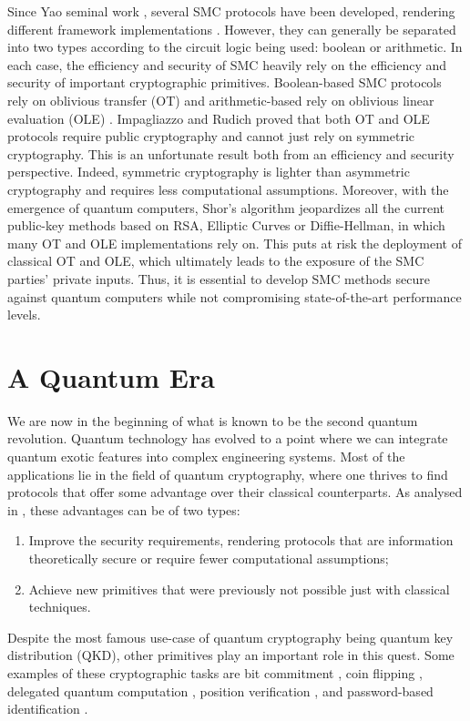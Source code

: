 Since Yao seminal work \cite{Y86}, several SMC protocols have been developed, rendering different framework implementations \cite{Goldreich87, Bendlin11, D12}. However, they can generally be separated into two types according to the circuit logic being used: boolean or arithmetic. In each case, the efficiency and security of SMC heavily rely on the efficiency and security of important cryptographic primitives. Boolean-based SMC protocols rely on oblivious transfer (OT) \cite{K88} and arithmetic-based rely on oblivious linear evaluation (OLE) \cite{DPSZ12}. Impagliazzo and Rudich \cite{IR99} proved that both OT and OLE protocols require public cryptography and cannot just rely on symmetric cryptography. This is an unfortunate result both from an efficiency and security perspective. Indeed, symmetric cryptography is lighter than asymmetric cryptography and requires less computational assumptions. Moreover, with the emergence of quantum computers, Shor’s algorithm \cite{Sho95} jeopardizes all the current public-key methods based on RSA, Elliptic Curves or Diffie-Hellman, in which many OT and OLE implementations rely on. This puts at risk the deployment of classical OT and OLE, which ultimately leads to the exposure of the SMC parties’ private inputs. Thus, it is essential to develop SMC methods secure against quantum computers while not compromising state-of-the-art performance levels.


\section*{A Quantum Era}

We are now in the beginning of what is known to be
the second quantum revolution. Quantum technology has evolved to a point where we can integrate quantum exotic features into complex engineering systems. Most of the applications lie in the field of quantum cryptography, where one thrives to find protocols that offer some advantage over their classical counterparts. As analysed in \cite{B15, PSAN13}, these advantages can be of two types:

\begin{enumerate}
    \item Improve the security requirements, rendering protocols that are information theoretically secure or require fewer computational assumptions;
    \item Achieve new primitives that were previously not possible just with classical techniques.
\end{enumerate}
Despite the most famous use-case of quantum cryptography being quantum key distribution (QKD), other primitives play an important role in this quest. Some examples of these cryptographic tasks are bit commitment \cite{CK11}, coin flipping \cite{CK09}, delegated quantum computation \cite{BFK09}, position verification \cite{Unr14}, and password-based identification \cite{DFSS14, DFLSS09}. 

